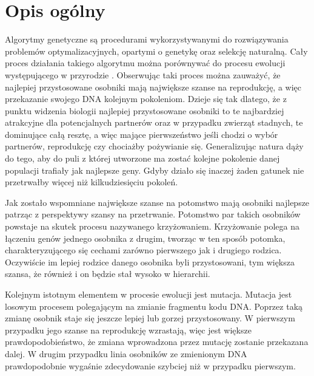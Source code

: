 \documentclass[twoside]{iisthesis}
\begin{document}
\section{Opis ogólny}
Algorytmy genetyczne są procedurami wykorzystywanymi do rozwiązywania problemów optymalizacyjnych, opartymi o genetykę oraz selekcję naturalną. Cały proces działania takiego algorytmu można porównywać do procesu ewolucji występującego w przyrodzie \cite{ga_book}. Obserwując taki proces można zauważyć, że najlepiej przystosowane osobniki mają największe szanse na reprodukcję, a więc przekazanie swojego DNA kolejnym pokoleniom. Dzieje się tak dlatego, że z punktu widzenia biologii najlepiej przystosowane osobniki to te najbardziej atrakcyjne dla potencjalnych partnerów oraz w przypadku zwierząt stadnych, te dominujące całą resztę, a więc mające pierwszeństwo jeśli chodzi o wybór partnerów, reprodukcję czy chociażby pożywianie się. Generalizując natura dąży do tego, aby do puli z której utworzone ma zostać kolejne pokolenie danej populacji trafiały jak najlepsze geny. Gdyby działo się inaczej żaden gatunek nie przetrwałby więcej niż kilkudziesięciu pokoleń.

Jak zostało wspomniane największe szanse na potomstwo mają osobniki najlepsze patrząc z perspektywy szansy na przetrwanie. Potomstwo par takich osobników powstaje na skutek procesu nazywanego krzyżowaniem. Krzyżowanie polega na łączeniu genów jednego osobnika z drugim, tworząc w ten sposób potomka, charakteryzującego się cechami zarówno pierwszego jak i drugiego rodzica. Oczywiście im lepiej rodzice danego osobnika byli przystosowani, tym większa szansa, że również i on będzie stał wysoko w hierarchii.

Kolejnym istotnym elementem w procesie ewolucji jest mutacja. Mutacja jest losowym procesem polegającym na zmianie fragmentu kodu DNA. Poprzez taką zmianę osobnik staje się jeszcze lepiej lub gorzej przystosowany. W pierwszym przypadku jego szanse na reprodukcję wzrastają, więc jest większe prawdopodobieństwo, że zmiana wprowadzona przez mutację zostanie przekazana dalej. W drugim przypadku linia osobników ze zmienionym DNA prawdopodobnie wygaśnie zdecydowanie szybciej niż w przypadku pierwszym.
\end{document}
